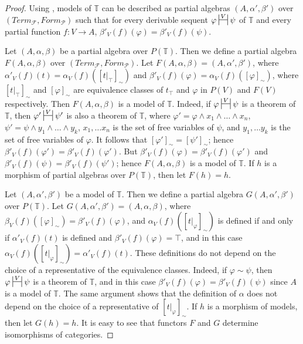 \documentclass[reqno]{amsart}
\theoremstyle{definition}
\theoremstyle{remark}
\numberwithin{figure}{section}
\begin{document}
\begin{proof}
Using , models of $\mathbb{T}$ can be described as partial algebras $(A,\alpha',\beta')$ over $(Term_\mathcal{F},Form_\mathcal{P})$
    such that for every derivable sequent $\varphi \ssststile{}{V} \psi$ of $\mathbb{T}$ and every partial function $f : V \to A$, $\beta'_V(f)(\varphi) = \beta'_V(f)(\psi)$.

Let $(A,\alpha,\beta)$ be a partial algebra over $P(\mathbb{T})$.
Then we define a partial algebra $F(A,\alpha,\beta)$ over $(Term_\mathcal{F},Form_\mathcal{P})$.
Let $F(A,\alpha,\beta) = (A,\alpha',\beta')$, where $\alpha'_V(f)(t) = \alpha_V(f)([t|_\top]_\sim)$ and $\beta'_V(f)(\varphi) = \alpha_V(f)([\varphi]_\sim)$,
    where $[t|_\top]_\sim$ and $[\varphi]_\sim$ are equivalence classes of $t_\top$ and $\varphi$ in $P(V)$ and $F(V)$ respectively.
Then $F(A,\alpha,\beta)$ is a model of $\mathbb{T}$.
Indeed, if $\varphi \ssststile{}{V} \psi$ is a theorem of $\mathbb{T}$, then $\varphi' \ssststile{}{V} \psi'$
    is also a theorem of $\mathbb{T}$, where $\varphi' = \varphi \land x_1 \land \ldots \land x_n$, $\psi' = \psi \land y_1 \land \ldots \land y_k$,
    $x_1, \ldots x_n$ is the set of free variables of $\psi$, and $y_1, \ldots y_k$ is the set of free variables of $\varphi$.
It follows that $[\varphi']_\sim = [\psi']_\sim$; hence $\beta'_V(f)(\varphi') = \beta'_V(f)(\varphi')$.
But $\beta'_V(f)(\varphi) = \beta'_V(f)(\varphi')$ and $\beta'_V(f)(\psi) = \beta'_V(f)(\psi')$; hence $F(A,\alpha,\beta)$ is a model of $\mathbb{T}$.
If $h$ is a morphism of partial algebras over $P(\mathbb{T})$, then let $F(h) = h$.

Let $(A,\alpha',\beta')$ be a model of $\mathbb{T}$.
Then we define a partial algebra $G(A,\alpha',\beta')$ over $P(\mathbb{T})$.
Let $G(A,\alpha',\beta') = (A,\alpha,\beta)$, where $\beta_V(f)([\varphi]_\sim) = \beta'_V(f)(\varphi)$, and $\alpha_V(f)([t|_\varphi]_\sim)$ is defined
    if and only if $\alpha'_V(f)(t)$ is defined and $\beta'_V(f)(\varphi) = \top$, and in this case $\alpha_V(f)([t|_\varphi]_\sim) = \alpha'_V(f)(t)$.
These definitions do not depend on the choice of a representative of the equivalence classes.
Indeed, if $\varphi \sim \psi$, then $\varphi \ssststile{}{V} \psi$ is a theorem of $\mathbb{T}$,
    and in this case $\beta'_V(f)(\varphi) = \beta'_V(f)(\psi)$ since $A$ is a model of $\mathbb{T}$.
The same argument shows that the definition of $\alpha$ does not depend on the choice of a representative of $[t|_\varphi]_\sim$.
If $h$ is a morphism of models, then let $G(h) = h$.
It is easy to see that functors $F$ and $G$ determine isomorphisms of categories.
\end{proof}
\end{document}
